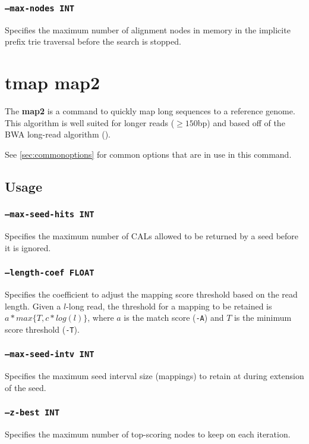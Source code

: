 \documentclass[a4paper,12pt]{book}
\newcommand{\TT}[1]{{\tt #1}} %
\newcommand{\BF}[1]{{\bf #1}} %
\begin{document}
\subsubsection{\TT{--max-nodes INT}}
Specifies the maximum number of alignment nodes in memory in the implicite prefix trie traversal before the search is stopped.

\section{tmap map2}
\label{sec:map2}
The \BF{map2} is a command to quickly map long sequences to a reference genome.
This algorithm is well suited for longer reads ($\geq 150$bp) and based off of the BWA long-read algorithm (\cite{BWA-long}).

See \autoref{sec:commonoptions} for common options that are in use in this command.

\subsection{Usage}

\subsubsection{\TT{--max-seed-hits INT}}
Specifies the maximum number of CALs allowed to be returned by a seed before it is ignored.

\subsubsection{\TT{--length-coef FLOAT}}
Specifies the coefficient to adjust the mapping score threshold based on the read length.
Given a $l$-long read, the threshold for a mapping to be retained is $a*max\{T,c*log(l)\}$, where $a$ is the match score (\TT{-A}) and $T$ is the minimum score threshold (\TT{-T}).

\subsubsection{\TT{--max-seed-intv INT}}
Specifies the maximum seed interval size (mappings) to retain at during extension of the seed.

\subsubsection{\TT{--z-best INT}}
Specifies the maximum number of top-scoring nodes to keep on each iteration.
\end{document}
